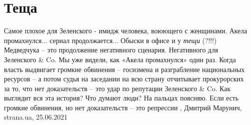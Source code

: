  
 
 
 
 
\chapter{Теща}

Самое плохое для Зеленского - имидж человека, воюющего с женщинами.  Акела
промахнулся... сериал продолжается... Обыски в офисе и у \emph{тещи} (?!!!) Медведчука –
это продолжение негативного сценария. Негативного для Зеленского \& Co.  Мы уже
видели, как «Акела промахнулся» один раз. Когда власть выдвигает громкие
обвинения – госизмена и разграбление национальных ресурсов – а потом судья на
заседании на всю страну отчитывает прокурорских за то, что нет доказательств –
это удар по репутации Зеленского \& Co.  Как выглядит вся эта история? Что
думают люди? На пальцах поясняю.  Если есть громкие обвинения, но нет
доказательств – это репрессии
, 
Дмитрий Марунич, strana.ua, 25.06.2021

